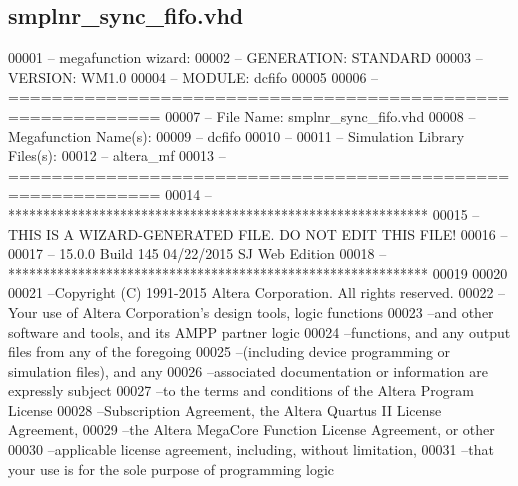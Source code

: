 \subsection{smplnr\+\_\+sync\+\_\+fifo.\+vhd}
\label{smplnr__sync__fifo_8vhd_source}

\begin{DoxyCode}
00001 \textcolor{keyword}{-- megafunction wizard: %
00002 \textcolor{keyword}{-- GENERATION: STANDARD}
00003 \textcolor{keyword}{-- VERSION: WM1.0}
00004 \textcolor{keyword}{-- MODULE: dcfifo }
00005 
00006 \textcolor{keyword}{-- ============================================================}
00007 \textcolor{keyword}{-- File Name: smplnr\_sync\_fifo.vhd}
00008 \textcolor{keyword}{-- Megafunction Name(s):}
00009 \textcolor{keyword}{--          dcfifo}
00010 \textcolor{keyword}{--}
00011 \textcolor{keyword}{-- Simulation Library Files(s):}
00012 \textcolor{keyword}{--          altera\_mf}
00013 \textcolor{keyword}{-- ============================================================}
00014 \textcolor{keyword}{-- ************************************************************}
00015 \textcolor{keyword}{-- THIS IS A WIZARD-GENERATED FILE. DO NOT EDIT THIS FILE!}
00016 \textcolor{keyword}{--}
00017 \textcolor{keyword}{-- 15.0.0 Build 145 04/22/2015 SJ Web Edition}
00018 \textcolor{keyword}{-- ************************************************************}
00019 
00020 
00021 \textcolor{keyword}{--Copyright (C) 1991-2015 Altera Corporation. All rights reserved.}
00022 \textcolor{keyword}{--Your use of Altera Corporation's design tools, logic functions }
00023 \textcolor{keyword}{--and other software and tools, and its AMPP partner logic }
00024 \textcolor{keyword}{--functions, and any output files from any of the foregoing }
00025 \textcolor{keyword}{--(including device programming or simulation files), and any }
00026 \textcolor{keyword}{--associated documentation or information are expressly subject }
00027 \textcolor{keyword}{--to the terms and conditions of the Altera Program License }
00028 \textcolor{keyword}{--Subscription Agreement, the Altera Quartus II License Agreement,}
00029 \textcolor{keyword}{--the Altera MegaCore Function License Agreement, or other }
00030 \textcolor{keyword}{--applicable license agreement, including, without limitation, }
00031 \textcolor{keyword}{--that your use is for the sole purpose of programming logic }
}
\end{DoxyCode}
